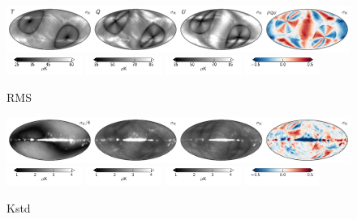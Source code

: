 \documentclass[twocolumn]{../../common/aa}
\begin{document}
\begin{figure}[t]
	\centering
	\includegraphics[width=\textwidth]{figures/023-WMAP_K_rms.pdf}\\
	\includegraphics[width=0.22\textwidth]{figures/cbar_rms_I.pdf}
	\includegraphics[width=0.22\textwidth]{figures/cbar_rms_P.pdf}
	\includegraphics[width=0.22\textwidth]{figures/cbar_rms_P.pdf}
	\includegraphics[width=0.22\textwidth]{figures/cbar_rho.pdf}
	\caption{RMS}
        \label{fig:Krms}
\end{figure}

\begin{figure}[t]
	\centering
	\includegraphics[width=\textwidth]{figures/023-WMAP_K_std.pdf}\\
	\includegraphics[width=0.22\textwidth]{figures/cbar_std.pdf}
	\includegraphics[width=0.22\textwidth]{figures/cbar_std.pdf}
	\includegraphics[width=0.22\textwidth]{figures/cbar_std.pdf}
	\includegraphics[width=0.22\textwidth]{figures/cbar_rho.pdf}\\
	\caption{Kstd}
        \label{fig:Kstd}
\end{figure}
\end{document}
